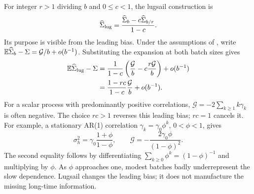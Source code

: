 For integer $r>1$ dividing $b$ and $0\leq c<1$, the lugsail construction is
\begin{equation}
 \widehat\Sigma_{\rm lug}
    =\frac{\widehat\Sigma_b-c\widehat\Sigma_{b/r}}{1-c}.
 \label{eq:bf-modern-lugsail}
\end{equation}
Its purpose is visible from the leading bias. Under the assumptions of
\citet[Theorem 4]{vats2021lugsail}, write
$\mathbb{E}\widehat\Sigma_b-\Sigma=\mathcal G/b+o(b^{-1})$.
Substituting the expansion at both batch sizes gives
\begin{align}
 \mathbb{E}\widehat\Sigma_{\rm lug}-\Sigma
 &=\frac{1}{1-c}
       \left(\frac{\mathcal G}{b}
                   -c\frac{r\mathcal G}{b}\right)+o(b^{-1})\\
 &=\frac{1-rc}{1-c}\frac{\mathcal G}{b}+o(b^{-1}).
 \label{eq:bf-modern-lugsail-bias}
\end{align}
For a scalar process with predominantly positive correlations,
$\mathcal G=-2\sum_{k\geq1}k\gamma_k$ is often negative. The choice
$rc>1$ reverses this leading bias; $rc=1$ cancels it. For example, a
stationary AR(1) correlation $\gamma_k=\gamma_0\phi^k$, $0<\phi<1$,
gives
\begin{equation}
 \sigma_h^2=\gamma_0\frac{1+\phi}{1-\phi},\qquad
 \mathcal G=-\frac{2\gamma_0\phi}{(1-\phi)^2}.
 \label{eq:bf-modern-ar1-batch-bias}
\end{equation}
The second equality follows by differentiating
$\sum_{k\geq0}\phi^k=(1-\phi)^{-1}$ and multiplying by $\phi$.
As $\phi$ approaches one, modest batches badly underrepresent the slow
dependence. Lugsail changes the leading bias; it does not manufacture the
missing long-time information.

